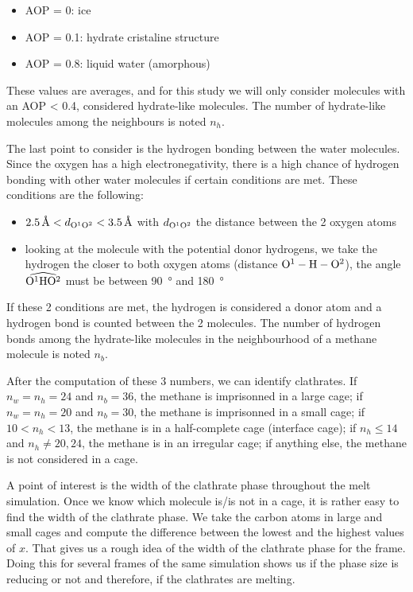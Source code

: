 \begin{itemize}
    \item AOP = \num{0}: ice
    \item AOP = \num{0.1}: hydrate cristaline structure
    \item AOP = \num{0.8}: liquid water (amorphous)
\end{itemize}

These values are averages, and for this study we will only consider molecules with an AOP < \num{0.4}, considered hydrate-like molecules. The number of hydrate-like molecules among the neighbours is noted $n_h$.

The last point to consider is the hydrogen bonding between the water molecules. Since the oxygen has a high electronegativity, there is a high chance of hydrogen bonding with other water molecules if certain conditions are met. These conditions are the following:

\begin{itemize}
    \item $\SI{2.5}{\angstrom} < d_{\ce{O}^1\ce{O}^2} < \SI{3.5}{\angstrom}$ with $d_{\ce{O}^1\ce{O}^2}$ the distance between the 2 oxygen atoms 
    \item looking at the molecule with the potential donor hydrogens, we take the hydrogen the closer to both oxygen atoms (distance $\ce{O}^1-\ce{H}-\ce{O}^2$), the angle $\widehat{\ce{O}^1\ce{H}\ce{O}^2}$ must be between \SI{90}{\degree} and \SI{180}{\degree}
\end{itemize}
If these 2 conditions are met, the hydrogen is considered a donor atom and a hydrogen bond is counted between the 2 molecules. The number of hydrogen bonds among the hydrate-like molecules in the neighbourhood of a methane molecule is noted $n_b$.

After the computation of these 3 numbers, we can identify clathrates. If $n_w = n_h = 24$ and $n_b = 36$, the methane is imprisonned in a large cage; if $n_w = n_h = 20$ and $n_b = 30$, the methane is imprisonned in a small cage; if $10 < n_h < 13$, the methane is in a half-complete cage (interface cage); if $n_h \leq 14$ and $n_h \neq 20, 24$, the methane is in an irregular cage; if anything else, the methane is not considered in a cage.

A point of interest is the width of the clathrate phase throughout the melt simulation. Once we know which molecule is/is not in a cage, it is rather easy to find the width of the clathrate phase. We take the carbon atoms in large and small cages and compute the difference between the lowest and the highest values of $x$. That gives us a rough idea of the width of the clathrate phase for the frame. Doing this for several frames of the same simulation shows us if the phase size is reducing or not and therefore, if the clathrates are melting.

